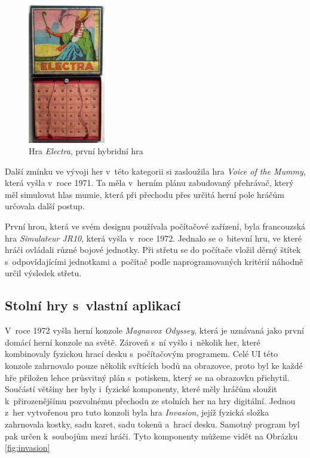 \begin{figure}[H]
    \centering
    \includegraphics[width=0.3\textwidth]{resources/figures/electra.jpg}
    \caption{Hra \textit{Electra}, první hybridní hra \cite{history_of_hybrid_games}}
    \label{fig:electra}
\end{figure}

Další zmínku ve vývoji her v~této kategorii si zasloužila hra \textit{Voice of the Mummy}, která vyšla v~roce 1971. Ta měla v~herním plánu zabudovaný přehrávač, který měl simulovat hlas mumie, která při přechodu přes určitá herní pole hráčům určovala další postup. \cite{voice_of_the_mummy}

První hrou, která ve svém designu používala počítačové zařízení, byla francouzská hra \textit{Simulateur JR10}, která vyšla v~roce 1972. Jednalo se o~bitevní hru, ve které hráči ovládali různé bojové jednotky. Při střetu se do počítače vložil děrný štítek s~odpovídajícími jednotkami a~počítač podle naprogramovaných kritérií náhodně určil výsledek střetu. \cite{simulateur_jr10}

\subsection{Stolní hry s~vlastní aplikací}
V~roce 1972 vyšla herní konzole \textit{Magnavox Odyssey}, která je uznávaná jako první domácí herní konzole na světě. Zároveň s~ní vyšlo i~několik her, které kombinovaly fyzickou hrací desku s~počítačovým programem. Celé UI této konzole zahrnovalo pouze několik svítících bodů na obrazovce, proto byl ke každé hře přiložen lehce průsvitný plán s~potiskem, který se na obrazovku přichytil. Součástí většiny her byly i~fyzické komponenty, které měly hráčům sloužit k~přirozenějšímu pozvolnému přechodu ze stolních her na hry digitální. \cite{magnavox_odyssey} Jednou z~her vytvořenou pro tuto konzoli byla hra \textit{Invasion}, jejíž fyzická složka zahrnovala kostky, sadu karet, sadu tokenů a~hrací desku. Samotný program byl pak určen k~soubojům mezi hráči. Tyto komponenty můžeme vidět na Obrázku \ref{fig:invasion} \cite{invasion,invasion_gameplay}

